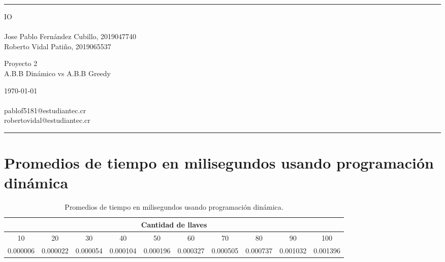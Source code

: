 \documentclass[a4paper]{article}
\begin{document}

\fancyhead[C]{}
\hrule \medskip %
\begin{minipage}{0.295\textwidth} %
\raggedright
IO\\ %
\footnotesize %
\hfill\\
Jose Pablo Fernández Cubillo, 2019047740 \\%
Roberto Vidal Patiño, 2019065537%
\end{minipage}
\begin{minipage}{0.4\textwidth} %
\centering 
\large %
Proyecto 2\\ %
\normalsize %
A.B.B Dinámico vs A.B.B Greedy\\ %
\end{minipage}
\begin{minipage}{0.295\textwidth} %
\raggedleft
\today\\ %
\footnotesize %
\hfill\\
pablof5181@estudiantec.cr\\
robertovidal@estudiantec.cr%
\end{minipage}
\medskip\hrule %
\bigskip

\section{Promedios de tiempo en milisegundos usando programación dinámica}

\begin{table}[H]
\centering
\relax
\resizebox{\textwidth}{!} {%
\begin{tabular}{|c|c|c|c|c|c|c|c|c|c|}
\hline
 \multicolumn{10}{|c|}{\textbf{Cantidad de llaves}} \\
 \hline 
10 & 20 & 30 & 40 & 50 & 60 & 70 & 80 & 90 & 100 \\
\hline
0.000006 & 0.000022 & 0.000054 & 0.000104 & 0.000196 & 0.000327 & 0.000505 & 0.000737 & 0.001032 & 0.001396 \\
\hline
\end{tabular}%
}
\caption{Promedios de tiempo en milisegundos usando programación dinámica.}
\end{table}
\end{document}
